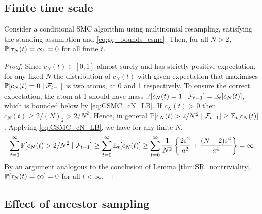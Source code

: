 \subsection{Finite time scale}

\begin{lemma}\label{thm:CSMC_nontriviality}
Consider a conditional SMC algorithm using multinomial resampling, satisfying the standing assumption and \eqref{eq:gq_bounds_csmc}. 
Then, for all $N>2$, $\mathbb{P}[ \tau_N(t) = \infty ]=0$ for all finite $t$.
\end{lemma}

\begin{proof}
Since $c_N(t) \in [0,1]$ almost surely and has strictly positive expectation, for any fixed $N$ the distribution of $c_N(t)$ with given expectation that maximises $\mathbb{P}[ c_N(t)=0 \mid \mathcal{F}_{t-1} ]$ is two atoms, at 0 and 1 respectively. To ensure the correct expectation, the atom at 1 should have mass $\mathbb{P}[ c_N(t)=1 \mid \mathcal{F}_{t-1} ] = \mathbb{E}_t [ c_N(t) ]$, which is bounded below by \eqref{eq:CSMC_cN_LB}.
If $c_N(t) > 0$ then $c_N(t) \geq 2/(N)_2 > 2/N^2$. Hence, in general $\mathbb{P}[ c_N(t) > 2/N^2 \mid \mathcal{F}_{t-1} ] \geq \mathbb{E}_t [c_N(t)]$. Applying \eqref{eq:CSMC_cN_LB}, we have for any finite $N$,
\begin{equation*}
\sum_{t=0}^\infty \mathbb{P}[ c_N(t) > 2/N^2 \mid \mathcal{F}_{t-1} ]
\geq \sum_{t=0}^\infty \mathbb{E}_t [ c_N(t) ]
\geq \sum_{t=0}^\infty \frac{1}{N^2} \left\{\frac{2\varepsilon^2}{a^2} + \frac{(N-2)\varepsilon^4}{a^4}  \right\}
= \infty
\end{equation*}
By an argument analogous to the conclusion of Lemma \ref{thm:SR_nontriviality}, $\mathbb{P}[ \tau_N(t) = \infty ] =0$ for all $t < \infty$.
\end{proof}


\subsection{Effect of ancestor sampling}
